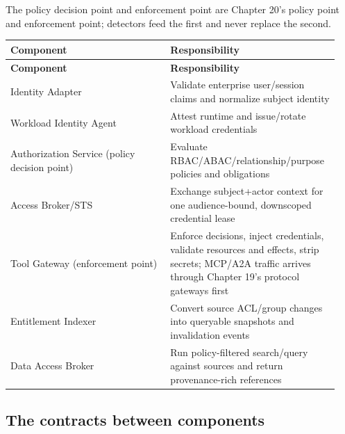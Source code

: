 The policy decision point and enforcement point are Chapter 20's policy point and enforcement point; detectors feed the first and never replace the second.\par

\BookTableStart
\small
\begin{longtable}{@{}Y{0.4700\linewidth}Y{0.4700\linewidth}@{}}
\color{white}\bfseries \textbf{Component} & \color{white}\bfseries \textbf{Responsibility} \\
\endfirsthead
{}
\color{white}\bfseries \textbf{Component} & \color{white}\bfseries \textbf{Responsibility} \\
\endhead
Identity Adapter & Validate enterprise user/session claims and normalize subject identity \\
Workload Identity Agent & Attest runtime and issue/rotate workload credentials \\
Authorization Service (policy decision point) & Evaluate RBAC/ABAC/relationship/purpose policies and obligations \\
Access Broker/STS & Exchange subject+actor context for one audience-bound, downscoped credential lease \\
Tool Gateway (enforcement point) & Enforce decisions, inject credentials, validate resources and effects, strip secrets; MCP/A2A traffic arrives through Chapter 19's protocol gateways first \\
Entitlement Indexer & Convert source ACL/group changes into queryable snapshots and invalidation events \\
Data Access Broker & Run policy-filtered search/query against sources and return provenance-rich references \\
\end{longtable}
\BookTableEnd

\subsection{The contracts between components}

